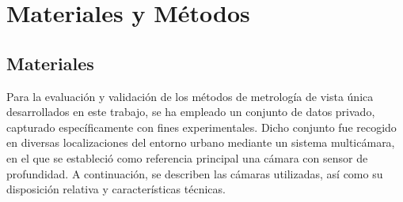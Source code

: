 \chapter{Materiales y Métodos}
\section{Materiales}
Para la evaluación y validación de los métodos de metrología de vista única desarrollados en este trabajo,
se ha empleado un conjunto de datos privado, capturado específicamente con fines experimentales.
Dicho conjunto fue recogido en diversas localizaciones del entorno urbano mediante un sistema multicámara,
en el que se estableció como referencia principal una cámara con sensor de profundidad. A continuación,
se describen las cámaras utilizadas, así como su disposición relativa y características técnicas.
